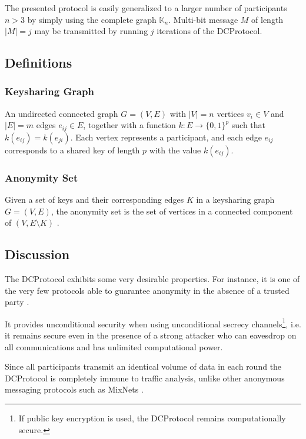 The presented protocol is easily generalized to a larger number of participants $n > 3$ by simply
using the complete graph $\mathbb{K}_n$. Multi-bit message $M$ of length $|M| = j$
may be transmitted by running $j$ iterations of the \ac{DCProtocol}.  

\subsection{Definitions}

\subsubsection{Keysharing Graph}

An undirected connected graph $G = (V, E)$ with $|V| = n$ vertices $v_i \in V$ and $|E| = m$ edges $e_{ij} \in E$,
together with a function $k: E \rightarrow \{0, 1\}^p$ such that $k(e_{ij}) = k(e_{ji})$.
Each vertex represents a participant, and each edge $e_{ij}$ corresponds to a shared key of length $p$ with the value
$k(e_{ij})$.

\subsubsection{Anonymity Set}

Given a set of keys and their corresponding edges $K$ in a keysharing graph $G = (V, E)$, the anonymity set is the set of vertices in a connected component of $(V, E \setminus K)$ \cite{journals/joc/Chaum88}.


\subsection{Discussion}

The \ac{DCProtocol} exhibits some very desirable properties. For instance, it is one of the very few
protocols able to guarantee anonymity in the absence of a trusted party \cite{conf/eurocrypt/GolleJ04}.

It provides unconditional security when using unconditional secrecy channels\footnote{
If public key encryption is used, the \ac{DCProtocol} remains computationally secure.},
i.e. it remains secure even in the presence of a
strong attacker who can eavesdrop on all communications and has unlimited computational power.

Since all participants transmit an identical volume of data in each round the \ac{DCProtocol}
is completely immune to traffic analysis, unlike other anonymous messaging protocols such
as \acp{MixNet} \cite{journals/cacm/Chaum81}.

